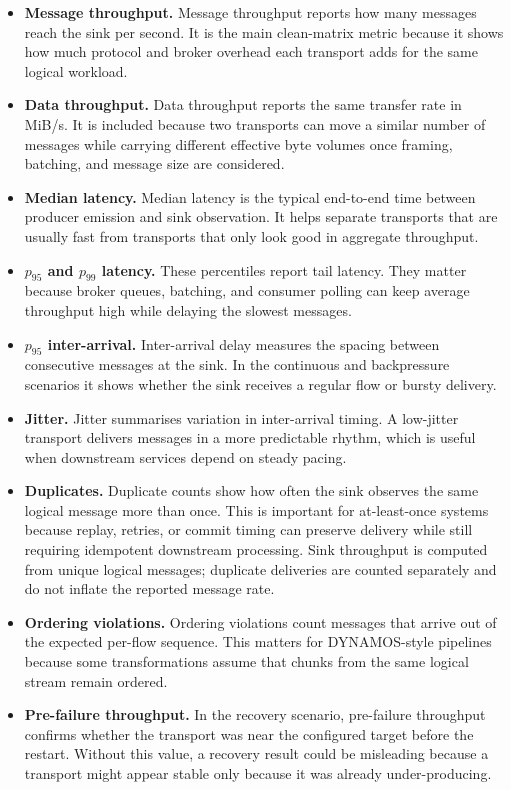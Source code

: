 \begin{itemize}
    \item \textbf{Message throughput.} Message throughput reports how many messages reach the sink per second. It is the main clean-matrix metric because it shows how much protocol and broker overhead each transport adds for the same logical workload.
    \item \textbf{Data throughput.} Data throughput reports the same transfer rate in MiB/s. It is included because two transports can move a similar number of messages while carrying different effective byte volumes once framing, batching, and message size are considered.
    \item \textbf{Median latency.} Median latency is the typical end-to-end time between producer emission and sink observation. It helps separate transports that are usually fast from transports that only look good in aggregate throughput.
    \item \textbf{$p_{95}$ and $p_{99}$ latency.} These percentiles report tail latency. They matter because broker queues, batching, and consumer polling can keep average throughput high while delaying the slowest messages.
    \item \textbf{$p_{95}$ inter-arrival.} Inter-arrival delay measures the spacing between consecutive messages at the sink. In the continuous and backpressure scenarios it shows whether the sink receives a regular flow or bursty delivery.
    \item \textbf{Jitter.} Jitter summarises variation in inter-arrival timing. A low-jitter transport delivers messages in a more predictable rhythm, which is useful when downstream services depend on steady pacing.
    \item \textbf{Duplicates.} Duplicate counts show how often the sink observes the same logical message more than once. This is important for at-least-once systems because replay, retries, or commit timing can preserve delivery while still requiring idempotent downstream processing. Sink throughput is computed from unique logical messages; duplicate deliveries are counted separately and do not inflate the reported message rate.
    \item \textbf{Ordering violations.} Ordering violations count messages that arrive out of the expected per-flow sequence. This matters for DYNAMOS-style pipelines because some transformations assume that chunks from the same logical stream remain ordered.
    \item \textbf{Pre-failure throughput.} In the recovery scenario, pre-failure throughput confirms whether the transport was near the configured target before the restart. Without this value, a recovery result could be misleading because a transport might appear stable only because it was already under-producing.

\end{itemize}
